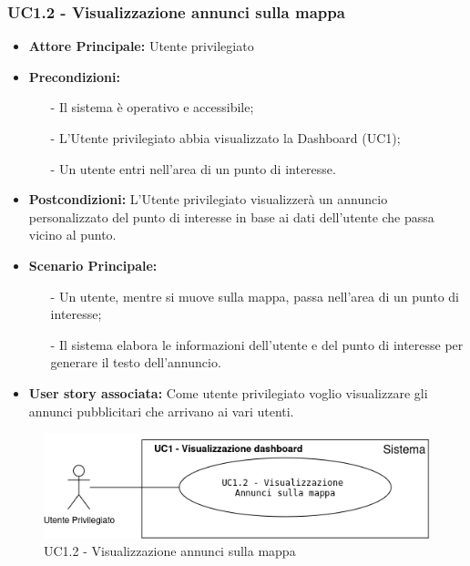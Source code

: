 \documentclass[11pt]{article}
\begin{document}
\begin{justify}
\subsubsection{\textbf{UC1.2 - Visualizzazione annunci sulla mappa}}
\begin{itemize}
	\item \textbf{Attore Principale:} Utente privilegiato
    \item \textbf{Precondizioni:} 
    	\begin{itemize}
    		\item [-] Il sistema è operativo e accessibile;
    		\item [-] L'Utente privilegiato abbia visualizzato la Dashboard (UC1);
    		\item [-] Un utente entri nell'area di un punto di interesse.
    	\end{itemize}
    \item \textbf{Postcondizioni:} L'Utente privilegiato visualizzerà un annuncio personalizzato del punto di interesse in base ai dati dell'utente che passa vicino al punto.
    \item \textbf{Scenario Principale:} 
    \begin{itemize}
    		\item [-] Un utente, mentre si muove sulla mappa, passa nell'area di un punto di interesse;
    		\item [-] Il sistema elabora le informazioni dell'utente e del punto di interesse per generare il testo dell'annuncio.
	\end{itemize}
    \item \textbf{User story associata:} Come utente privilegiato voglio visualizzare gli annunci pubblicitari che arrivano ai vari utenti.
\end{itemize}
\begin{figure}[ht]
    \centering
    \includegraphics[width=0.5\linewidth]{UC1.2image.png}
    \caption{UC1.2 - Visualizzazione annunci sulla mappa}
    \label{fig:UC1.2}
\end{figure}

\end{justify}
\end{document}

